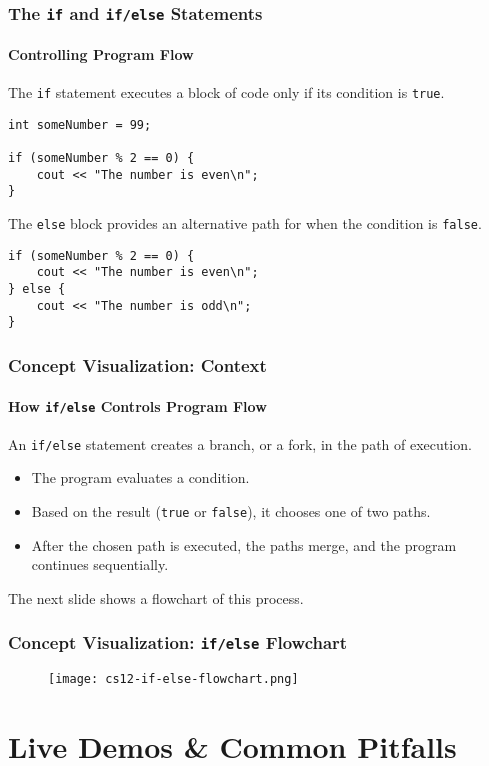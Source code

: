 \documentclass{beamer}
\begin{document}
\begin{frame}[fragile]
\frametitle{The \texttt{if} and \texttt{if/else} Statements}
\framesubtitle{Controlling Program Flow}

The \texttt{if} statement executes a block of code only if its condition is \texttt{true}.

\begin{verbatim}
int someNumber = 99;

if (someNumber % 2 == 0) {
    cout << "The number is even\n";
}
\end{verbatim}

\pause
The \texttt{else} block provides an alternative path for when the condition is \texttt{false}.

\begin{verbatim}
if (someNumber % 2 == 0) {
    cout << "The number is even\n";
} else {
    cout << "The number is odd\n";
}
\end{verbatim}
\end{frame}

\begin{frame}
\frametitle{Concept Visualization: Context}
\framesubtitle{How \texttt{if/else} Controls Program Flow}
An \texttt{if/else} statement creates a branch, or a fork, in the path of execution.

\begin{itemize}
    \item The program evaluates a \alert{condition}.
    \item Based on the result (\texttt{true} or \texttt{false}), it chooses one of two paths.
    \item After the chosen path is executed, the paths merge, and the program continues sequentially.
\end{itemize}

The next slide shows a flowchart of this process.
\end{frame}

\begin{frame}
\frametitle{Concept Visualization: \texttt{if/else} Flowchart}
\begin{figure}
    \texttt{[image: cs12-if-else-flowchart.png]}
\end{figure}
\end{frame}

\section{Live Demos \& Common Pitfalls}
\end{document}
